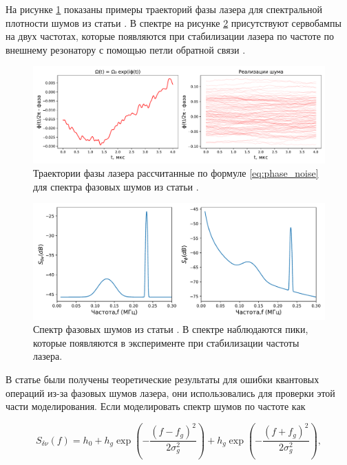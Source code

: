 На рисунке \ref{fig:noise_trajectories} показаны примеры траекторий фазы лазера для спектральной плотности шумов из статьи \cite{Saffman_Noise}. В спектре на рисунке \ref{fig:phase_spectrum} присутствуют сервобампы на двух частотах, которые появляются при стабилизации лазера по частоте по внешнему резонатору с помощью петли обратной связи \cite{PDH_Intro}. 

\begin{figure}[ht]
	\centering
	\includegraphics[width=1.0\textwidth]{images/phase_trajectories.pdf}
	\caption{Траектории фазы лазера рассчитанные по формуле \ref{eq:phase_noise} для спектра фазовых шумов из статьи \cite{Saffman_Noise}.}
	\label{fig:noise_trajectories}
\end{figure}

\begin{figure}[ht]
	\centering
	\includegraphics[width=1.0\textwidth]{images/phase_spectrum.pdf}
	\caption{Спектр фазовых шумов из статьи \cite{Saffman_Noise}. В спектре наблюдаются пики, которые появляются в эксперименте при стабилизации частоты лазера.}
	\label{fig:phase_spectrum}
\end{figure}

В статье \cite{Saffman_Noise} были получены теоретические результаты для ошибки квантовых операций из-за фазовых шумов лазера, они использовались для проверки этой части моделирования. Если моделировать спектр шумов по частоте как  

\begin{equation}
	S_{\delta\nu}(f) = h_0 + h_g \exp\left(-\frac{(f-f_g)^2}{2\sigma_g^2}\right) + h_g \exp\left(-\frac{(f+f_g)^2}{2\sigma_g^2}\right), 
\end{equation}

